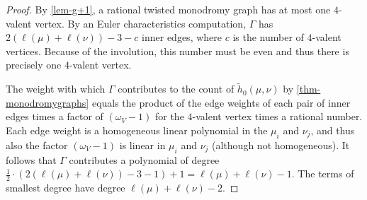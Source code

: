 \documentclass[10pt]{amsart}
\theoremstyle{plain}
\theoremstyle{definition}
\theoremstyle{definition}
\theoremstyle{plain}
\theoremstyle{plain}
\theoremstyle{remark}
\theoremstyle{plain}
\theoremstyle{plain}
\begin{document}
 \begin{proof}
 By \cref{lem-g+1}, a rational twisted monodromy graph has at most one $4$-valent vertex. By an Euler characteristics computation, $\Gamma$ has $2(\ell(\mu)+\ell(\nu))-3-c$ inner edges, where $c$ is the number of $4$-valent vertices. Because of the involution, this number must be even and thus there is precisely one $4$-valent vertex.
 
 The weight with which $\Gamma$ contributes to the count of $\tilde{h}_0(\mu,\nu)$ by \cref{thm-monodromygraphs} equals the product of the edge weights of each pair of inner edges times a factor of $(\omega_V-1)$ for the $4$-valent vertex times a rational number.
 Each edge weight is a homogeneous linear polynomial in the $\mu_i$ and $\nu_j$, and thus also the factor $(\omega_V-1)$ is linear in $\mu_i$ and $\nu_j$ (although not homogeneous).
 It follows that $\Gamma$ contributes a polynomial of degree $\frac{1}{2}\cdot (2(\ell(\mu)+\ell(\nu))-3-1)+1= \ell(\mu)+\ell(\nu)-1$. The terms of smallest degree have degree $\ell(\mu)+\ell(\nu)-2$.
 \end{proof}
\end{document}
